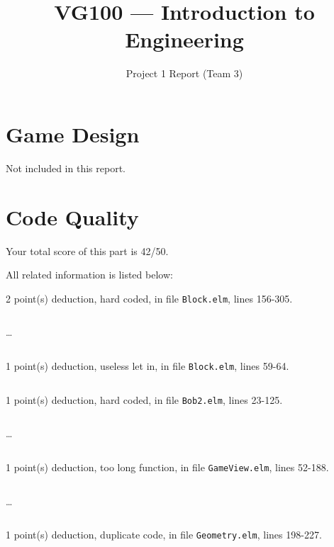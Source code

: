 \documentclass{article}
\title{VG100 --- Introduction to\\ Engineering}
\subtitle{Project 1 Report (Team 3)}
\begin{document}
\maketitle

\section{Game Design}

Not included in this report.

\section{Code Quality}

Your total score of this part is 42/50. \medskip

All related information is listed below: \medskip

2 point(s) {\color{red}deduction}, hard coded, in file {\color{blue}\texttt{Block.elm}}, lines {\color{blue}156-305}.

\inputminted[firstline=156,lastline=165]{elm}{Block.elm}

\dots

\inputminted[firstline=296,lastline=305]{elm}{Block.elm}

1 point(s) {\color{red}deduction}, useless let in, in file {\color{blue}\texttt{Block.elm}}, lines {\color{blue}59-64}.

\inputminted[firstline=59,lastline=64]{elm}{Block.elm}

1 point(s) {\color{red}deduction}, hard coded, in file {\color{blue}\texttt{Bob2.elm}}, lines {\color{blue}23-125}.

\inputminted[firstline=23,lastline=32]{elm}{Bob2.elm}

\dots

\inputminted[firstline=116,lastline=125]{elm}{Bob2.elm}

1 point(s) {\color{red}deduction}, too long function, in file {\color{blue}\texttt{GameView.elm}}, lines {\color{blue}52-188}.

\inputminted[firstline=52,lastline=61]{elm}{GameView.elm}

\dots

\inputminted[firstline=179,lastline=188]{elm}{GameView.elm}

1 point(s) {\color{red}deduction}, duplicate code, in file {\color{blue}\texttt{Geometry.elm}}, lines {\color{blue}198-227}.

\inputminted[firstline=198,lastline=207]{elm}{Geometry.elm}
\end{document}
